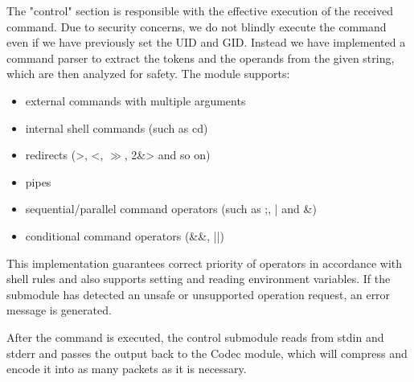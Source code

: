 The "control" section is responsible with the effective execution of the received
command. Due to security concerns, we do not blindly execute the command even if
we have previously set the UID and GID. Instead we have implemented a command parser
to extract the tokens and the operands from the given string, which are then
analyzed for safety. The module supports:
\begin{itemize}
\item external commands with multiple arguments
\item internal shell commands (such as cd)
\item redirects (>, <, $\gg$, 2\&> and so on)
\item pipes
\item sequential/parallel command operators (such as ;, | and \&)
\item conditional command operators (\&\&, ||) 
\end{itemize}

This implementation guarantees correct priority of operators in accordance with
shell rules and also supports setting and reading environment variables.
If the submodule has detected an unsafe or unsupported operation request,
an error message is generated.

After the command is executed, the control submodule reads from stdin and stderr
and passes the output back to the Codec module, which will compress and encode
it into as many packets as it is necessary.

